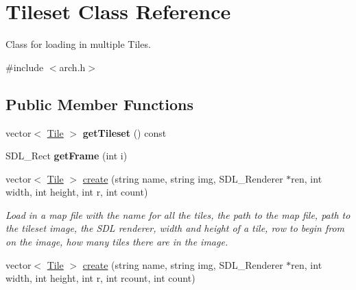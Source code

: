 \hypertarget{classTileset}{}\section{Tileset Class Reference}
\label{classTileset}


Class for loading in multiple Tiles.  




{\ttfamily \#include $<$arch.\+h$>$}

\subsection*{Public Member Functions}
\begin{DoxyCompactItemize}
\item 
vector$<$ \hyperlink{classTile}{Tile} $>$ {\bfseries get\+Tileset} () const \hypertarget{classTileset_ae5f7859d69952b223bdb322796bcc9f2}{}\label{classTileset_ae5f7859d69952b223bdb322796bcc9f2}

\item 
S\+D\+L\+\_\+\+Rect {\bfseries get\+Frame} (int i)\hypertarget{classTileset_aefa962edb9c573aca7327387ba6be0b1}{}\label{classTileset_aefa962edb9c573aca7327387ba6be0b1}

\item 
vector$<$ \hyperlink{classTile}{Tile} $>$ \hyperlink{classTileset_ad11cd044d9a2907003fee3baacba86e7}{create} (string name, string img, S\+D\+L\+\_\+\+Renderer $\ast$ren, int width, int height, int r, int count)\hypertarget{classTileset_ad11cd044d9a2907003fee3baacba86e7}{}\label{classTileset_ad11cd044d9a2907003fee3baacba86e7}

\begin{DoxyCompactList}\small\item\em Load in a map file with the name for all the tiles, the path to the map file, path to the tileset image, the S\+DL renderer, width and height of a tile, row to begin from on the image, how many tiles there are in the image. \end{DoxyCompactList}\item 
vector$<$ \hyperlink{classTile}{Tile} $>$ \hyperlink{classTileset_a1435c7ce70c5aa6da6388762971917aa}{create} (string name, string img, S\+D\+L\+\_\+\+Renderer $\ast$ren, int width, int height, int r, int rcount, int count)\hypertarget{classTileset_a1435c7ce70c5aa6da6388762971917aa}{}\label{classTileset_a1435c7ce70c5aa6da6388762971917aa}


\end{DoxyCompactItemize}
